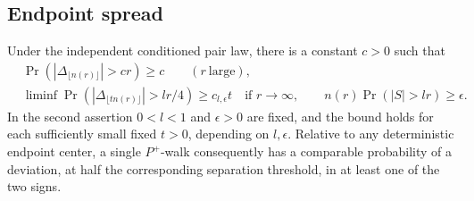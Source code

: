 \subsection{Endpoint spread}

\begin{lemma}
\label{fluct-endpoint-spread}
Under the independent conditioned pair law, there is a constant
\(c>0\) such that
\[
\begin{split}
&\Pr(|\Delta_{\lfloor n(r)\rfloor}|>cr)\ge c
       \qquad(r\ \text{large}),\\
&\liminf\Pr(|\Delta_{\lfloor tn(r)\rfloor}|>lr/4)
       \ge c_{l,\epsilon}t
 \quad\text{if }r\to\infty,\qquad
       n(r)\Pr(|S|>lr)\ge\epsilon.
\end{split}
\tag{13}\label{eq:13}
\]
In the second assertion \(0<l<1\) and \(\epsilon>0\) are fixed,
and the bound holds for each sufficiently small fixed \(t>0\),
depending on \(l,\epsilon\). Relative to any deterministic endpoint
center, a single \(P^+\)-walk consequently has a comparable
probability of a deviation, at half the corresponding separation
threshold, in at least one of the two signs.
\end{lemma}

